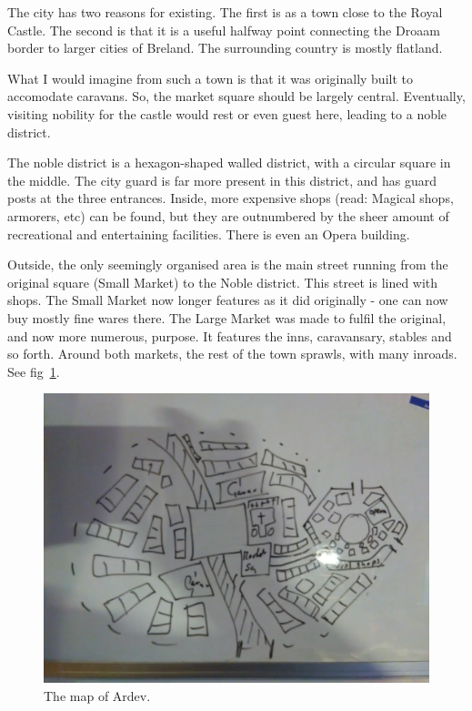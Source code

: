 The city has two reasons for existing. The first is as a town close to the Royal Castle. The second is that it is a useful halfway point connecting the Droaam border to larger cities of Breland. The surrounding country is mostly flatland.

What I would imagine from such a town is that it was originally built to accomodate caravans. So, the market square should be largely central. Eventually, visiting nobility for the castle would rest or even guest here, leading to a noble district. 

The noble district is a hexagon-shaped walled district, with a circular square in the middle. The city guard is far more present in this district, and has guard posts at the three entrances. Inside, more expensive shops (read: Magical shops, armorers, etc) can be found, but they are outnumbered by the sheer amount of recreational and entertaining facilities. There is even an Opera building.

Outside, the only seemingly organised area is the main street running from the original square (Small Market) to the Noble district. This street is lined with shops. The Small Market now longer features as it did originally - one can now buy mostly fine wares there. The Large Market was made to fulfil the original, and now more numerous, purpose. It features the inns, caravansary, stables and so forth. Around both markets, the rest of the town sprawls, with many inroads. See fig~\ref{fig:ardev}.

\begin{figure}[b]
    \centering
    \includegraphics[width=.95\textwidth]{fig/ardev}
    \caption{\label{fig:ardev} The map of Ardev.}
\end{figure}

